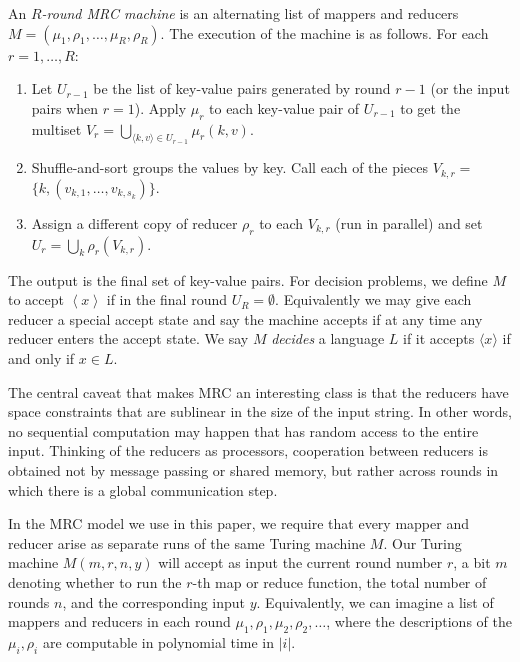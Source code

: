 \documentclass{llncs}
\begin{document}
\begin{definition}
An \emph{$R$-round MRC machine} is an alternating list of mappers and reducers
$M = (\mu_1, \rho_1, \dots, \mu_R, \rho_R)$. The execution of the machine is as
follows.
For each $r = 1, \dots, R$:
\begin{enumerate}
  \item Let $U_{r-1}$ be the list of key-value pairs generated by round $r-1$
(or the input pairs when $r=1$). Apply $\mu_r$ to each key-value pair of
$U_{r-1}$ to get the multiset $V_r = \bigcup_{\langle k,v \rangle \in U_{r-1}}
\mu_r(k, v).$

  \item Shuffle-and-sort groups the values by key. Call each of the pieces $V_{k,r} =$
$\{ k, (v_{k,1}, \dots, v_{k,s_k})\}.$

  \item Assign a different copy of reducer $\rho_r$ to each $V_{k,r}$ (run in
parallel) and set $U_r = \bigcup_{k}\rho_r(V_{k,r})$.
\end{enumerate}
\end{definition}

The output is the final set of key-value pairs. For decision problems, we
define $M$ to accept $\left \langle x \right \rangle$ if in the final round
$U_R = \emptyset$. Equivalently we may give each reducer a special accept state
and say the machine accepts if at any time any reducer enters the accept state.
We say $M$ \emph{decides} a language $L$ if it accepts $\langle x \rangle$ if
and only if $x \in L$.

The central caveat that makes MRC an interesting class is that the reducers
have space constraints that are sublinear in the size of the input string. In
other words, no sequential computation may happen that has random access to the
entire input. Thinking of the reducers as processors, cooperation between
reducers is obtained not by message passing or shared memory, but rather across
rounds in which there is a global communication step.

In the MRC model we use in this paper, we require that every mapper and reducer
arise as separate runs of the same Turing machine $M$. Our Turing machine $M(m,
r, n, y)$ will accept as input the current round number $r$, a bit $m$ denoting
whether to run the $r$-th map or reduce function, the total number of rounds
$n$, and the corresponding input $y$.  Equivalently, we can imagine a list of
mappers and reducers in each round $\mu_1, \rho_1, \mu_2, \rho_2, \dots$, where
the descriptions of the $\mu_i, \rho_i$ are computable in
polynomial time in $|i|$. 
\end{document}

